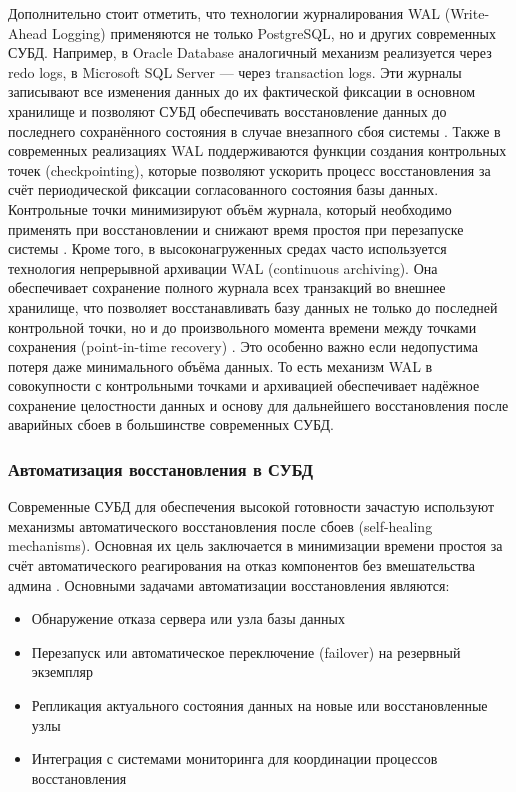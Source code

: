 Дополнительно стоит отметить, что технологии журналирования WAL (Write-Ahead Logging) применяются не только PostgreSQL, но и других современных СУБД. Например, в Oracle Database аналогичный механизм реализуется через redo logs, в Microsoft SQL Server — через transaction logs. Эти журналы записывают все изменения данных до их фактической фиксации в основном хранилище и позволяют СУБД обеспечивать восстановление данных до последнего сохранённого состояния в случае внезапного сбоя системы \autocite{OszuValduriez}.
Также в современных реализациях WAL поддерживаются функции создания контрольных точек (checkpointing), которые позволяют ускорить процесс восстановления за счёт периодической фиксации согласованного состояния базы данных. Контрольные точки минимизируют объём журнала, который необходимо применять при восстановлении и снижают время простоя при перезапуске системы \autocite{GarciaMolina}.
Кроме того, в высоконагруженных средах часто используется технология непрерывной архивации WAL (continuous archiving). Она обеспечивает сохранение полного журнала всех транзакций во внешнее хранилище, что позволяет восстанавливать базу данных не только до последней контрольной точки, но и до произвольного момента времени между точками сохранения (point-in-time recovery) \autocite{Bernstein}. 
Это особенно важно если недопустима потеря даже минимального объёма данных.
То есть механизм WAL в совокупности с контрольными точками и архивацией обеспечивает надёжное сохранение целостности данных и основу для дальнейшего восстановления после аварийных сбоев в большинстве современных СУБД.


\subsubsection{Автоматизация восстановления в СУБД}

Современные СУБД для обеспечения высокой готовности зачастую используют механизмы автоматического восстановления после сбоев (self-healing mechanisms). Основная их цель заключается в минимизации времени простоя за счёт автоматического реагирования на отказ компонентов без вмешательства админа \autocite{SameerParadkar}.
Основными задачами автоматизации восстановления являются:
\begin{itemize}
    \item Обнаружение отказа сервера или узла базы данных
    \item Перезапуск или автоматическое переключение (failover) на резервный экземпляр
    \item Репликация актуального состояния данных на новые или восстановленные узлы
    \item Интеграция с системами мониторинга для координации процессов восстановления
\end{itemize}

